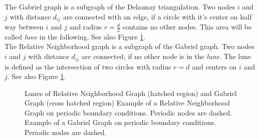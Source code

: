     The Gabriel graph \cite{Gabriel1969} is a subgraph of the
    Delaunay triangulation. Two nodes \(i\) and \(j\) with distance
    \(d_{ij}\) are connected with an edge, if a circle with it's
    center on half way between \(i\) and \(j\) and radius
    \(r = \frac d 2\) contains no other nodes. This area will be
    called \emph{lune} in the following. See also Figure
    \ref{fig:lunes}.\\
    The Relative Neighborhood graph \cite{Toussaint1980} is a
    subgraph of the Gabriel graph. Two nodes \(i\) and \(j\) with
    distance \(d_{ij}\) are connected, if no other node is in the
    \emph{lune}. The lune is defined as the intersection of two
    circles with radius \(r = d\) and centers on \(i\) and \(j\).
    See also Figure \ref{fig:lunes}.
    \begin{figure}[htbp]
        \centering
        \caption[Gabriel - and Relative Neighborhood Graph]
        {
             Lunes of Relative Neighborhood
                Graph (hatched region) and
                Gabriel Graph (cross hatched region)
             Example of a Relative
                Neighborhood Graph on periodic boundary conditions.
                Periodic nodes are dashed.
             Example of a Gabriel Graph on
                periodic boundary conditions. Periodic nodes are
                dashed.
        }
        \label{fig:lunes}
    \end{figure}\\
